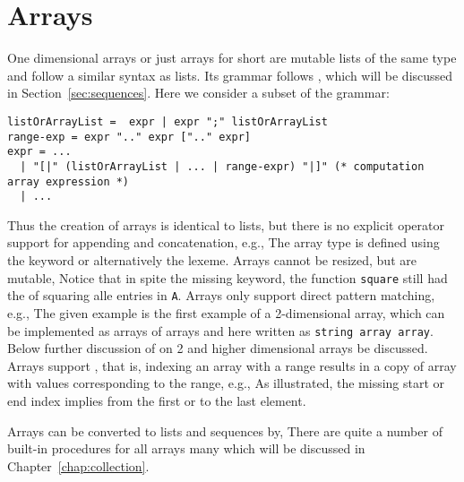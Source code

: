 \section{Arrays}
\label{sec:arrays}
One dimensional arrays or just arrays for short are mutable lists of the same type and follow a similar syntax as lists. Its grammar follows , which will be discussed in Section~\ref{sec:sequences}. Here we consider a subset of the grammar:
%
\begin{lstlisting}[language=ebnf]
listOrArrayList =  expr | expr ";" listOrArrayList
range-exp = expr ".." expr [".." expr]
expr = ... 
  | "[|" (listOrArrayList | ... | range-expr) "|]" (* computation array expression *)
  | ...
\end{lstlisting}
%
Thus the creation of arrays is identical to lists, but there is no explicit operator support for appending and concatenation, e.g.,
%
%
The array type is defined using the  keyword or alternatively the \keyword{[]} lexeme. Arrays cannot be resized, but are mutable,
%
%
Notice that in spite the missing  keyword, the function \lstinline{square} still had the  of squaring alle entries in \lstinline{A}.  Arrays only support direct pattern matching, e.g.,
%
%
The given example is the first example of a 2-dimensional array, which can be implemented as arrays of arrays and here written as \lstinline!string array array!. Below further discussion of on 2 and higher dimensional arrays be discussed.  Arrays support , that is, indexing an array with a range results in a copy of array with values corresponding to the range, e.g.,
%
%
As illustrated, the missing start or end index implies from the first or to the last element.

Arrays can be converted to lists and sequences by,
%
%
There are quite a number of built-in procedures for all arrays many which will be discussed in Chapter~\ref{chap:collection}.

